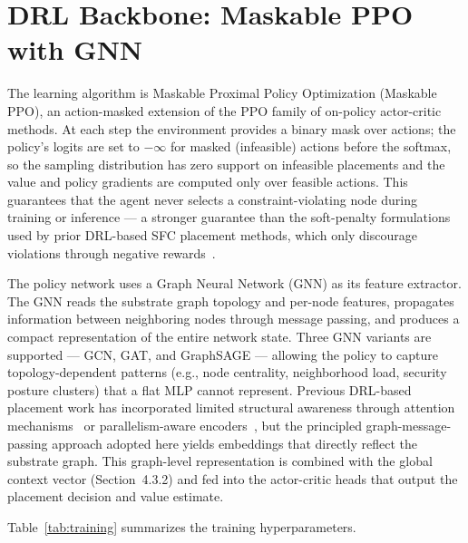 \section{DRL Backbone: Maskable PPO with GNN}

The learning algorithm is Maskable Proximal Policy Optimization (Maskable PPO), an action-masked extension of the PPO family of on-policy actor-critic methods. At each step the environment provides a binary mask over actions; the policy's logits are set to $-\infty$ for masked (infeasible) actions before the softmax, so the sampling distribution has zero support on infeasible placements and the value and policy gradients are computed only over feasible actions. This guarantees that the agent never selects a constraint-violating node during training or inference --- a stronger guarantee than the soft-penalty formulations used by prior DRL-based SFC placement methods, which only discourage violations through negative rewards~\cite{ran_dynamic_2023, zhang_dqn-msra_2025, taktak_drl_2024, xu_dynamic_2023, khemili_parallel_2024}.

The policy network uses a Graph Neural Network (GNN) as its feature extractor. The GNN reads the substrate graph topology and per-node features, propagates information between neighboring nodes through message passing, and produces a compact representation of the entire network state. Three GNN variants are supported --- GCN, GAT, and GraphSAGE --- allowing the policy to capture topology-dependent patterns (e.g., node centrality, neighborhood load, security posture clusters) that a flat MLP cannot represent. Previous DRL-based placement work has incorporated limited structural awareness through attention mechanisms~\cite{he_leveraging_2023} or parallelism-aware encoders~\cite{lin_lppif_2025, wang_fairness-aware_2025}, but the principled graph-message-passing approach adopted here yields embeddings that directly reflect the substrate graph. This graph-level representation is combined with the global context vector (Section~4.3.2) and fed into the actor-critic heads that output the placement decision and value estimate.

Table~\ref{tab:training} summarizes the training hyperparameters.

